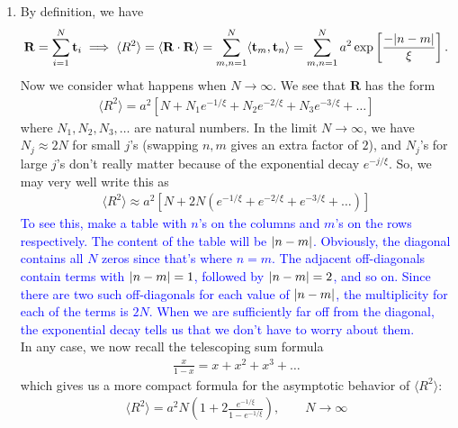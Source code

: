 \documentclass{article}
\theoremstyle{definition}
\newcommand{\f}[2]{\frac{#1}{#2}}
\newcommand{\lp}{\left(}
\newcommand{\rp}{\right)}
\newcommand{\lb}{\left[}
\newcommand{\rb}{\right]}
\begin{document}
\begin{enumerate}[label=(\alph*)]
	
	
	\item By definition, we have
	\begin{align*}
	\mathbf{R} = \sum_{i=1}^N \mathbf{t}_i \implies \langle R^2 \rangle = \langle \mathbf{R}\cdot \mathbf{R} \rangle = \sum_{m,n=1}^{N} \langle \mathbf{t}_m, \mathbf{t}_n \rangle 
	= \sum_{m,n=1}^{N} a^2 \exp\lb \f{-\abs{n-m}}{\xi} \rb.
	\end{align*}
	Now we consider what happens when $N\to \infty$. We see that $\mathbf{R}$ has the form 
	\begin{align*}
	\langle R^2 \rangle = a^2 \lb N  + N_1e^{-1/\xi} + N_2 e^{-2/\xi} + N_3 e^{-3/\xi} + \dots  \rb 
	\end{align*}   
	where $N_1,N_2,N_3,\dots$ are natural numbers. In the limit $N\to \infty$, we have $N_j\approx 2N$ for small $j$'s (swapping $n,m$ gives an extra factor of $2$), and $N_j$'s for large $j$'s don't really matter because of the exponential decay $e^{-j/\xi}$. So, we may very well write this as 
	\begin{align*}
	\langle R^2 \rangle \approx a^2 \lb N + 2N \lp e^{-1/\xi} + e^{-2/\xi} + e^{-3/\xi} + \dots \rp \rb 
	\end{align*}
	\textcolor{blue}{To see this, make a table with $n$'s on the columns and $m$'s on the rows respectively. The content of the table will be $\abs{n-m}$. Obviously, the diagonal contains all $N$ zeros since that's where $n=m$. The adjacent off-diagonals contain terms with $\abs{n-m}=1$, followed by $\abs{n-m}=2$, and so on. Since there are two such off-diagonals for each value of $\abs{n-m}$, the multiplicity for each of the terms is $2N$. When we are sufficiently far off from the diagonal, the exponential decay tells us that we don't have to worry about them. }\\
	
	
	In any case, we now recall the telescoping sum formula
	\begin{align*}
	\f{x}{1-x} = x+x^2+x^3 + \dots
	\end{align*}
	which gives us a more compact formula for the asymptotic behavior of $\langle R^2 \rangle$:
	\begin{align*}
	\boxed{\langle R^2 \rangle = a^2 N \lp 1 + 2\f{e^{-1/\xi}}{1-e^{-1/\xi}} \rp,\quad\quad N\to \infty }
	\end{align*}
	

\end{enumerate}
\end{document}
